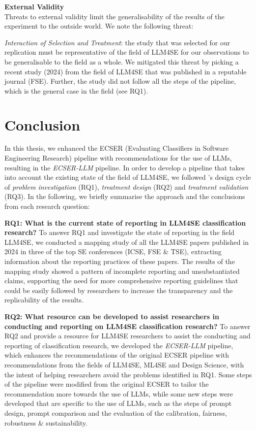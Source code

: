 \documentclass[a4paper]{article}
\newcommand{\newecser}{\textit{ECSER-LLM} }
\begin{document}
\textbf{External Validity}\\
Threats to external validity limit the generalisability of the results of the experiment to the outside world. We note the following threat:

\textit{Interaction of Selection and Treatment}: the study that was selected for our replication must be representative of the field of LLM4SE for our observations to be generalisable to the field as a whole. We mitigated this threat by picking a recent study (2024) from the field of LLM4SE that was published in a reputable journal (FSE). Further, the study did not follow all the steps of the pipeline, which is the general case in the field (see RQ1).

\section{Conclusion}
\label{conclusion}
In this thesis, we enhanced the ECSER (Evaluating Classifiers in Software Engineering Research) pipeline with recommendations for the use of LLMs, resulting in the \newecser pipeline. In order to develop a pipeline that takes into account the existing state of the field of LLM4SE, we followed \textcite{Wieringa2014}'s design cycle of \textit{problem investigation} (RQ1), \textit{treatment design} (RQ2) and \textit{treatment validation} (RQ3). In the following, we briefly summarise the approach and the conclusions from each research question:

\textbf{RQ1: What is the current state of reporting in LLM4SE classification research?}
To answer RQ1 and investigate the state of reporting in the field LLM4SE, we conducted a mapping study of all the LLM4SE papers published in 2024 in three of the top SE conferences (ICSE, FSE \& TSE), extracting information about the reporting practices of these papers. The results of the mapping study showed a pattern of incomplete reporting and unsubstantiated claims, supporting the need for more comprehensive reporting guidelines that could be easily followed by researchers to increase the transparency and the replicability of the results. 

\textbf{RQ2: What resource can be developed to assist researchers in conducting and reporting on LLM4SE classification research?}
To answer RQ2 and provide a resource for LLM4SE researchers to assist the conducting and reporting of classification research, we developed the \newecser pipeline, which enhances the recommendations of the original ECSER pipeline with recommendations from the fields of LLM4SE, ML4SE and Design Science, with the intent of helping researchers avoid the problems identified in RQ1. Some steps of the pipeline were modified from the original ECSER to tailor the recommendation more towards the use of LLMs, while some new steps were developed that are specific to the use of LLMs, such as the steps of prompt design, prompt comparison and the evaluation of the calibration, fairness, robustness \& sustainability. 
\end{document}
